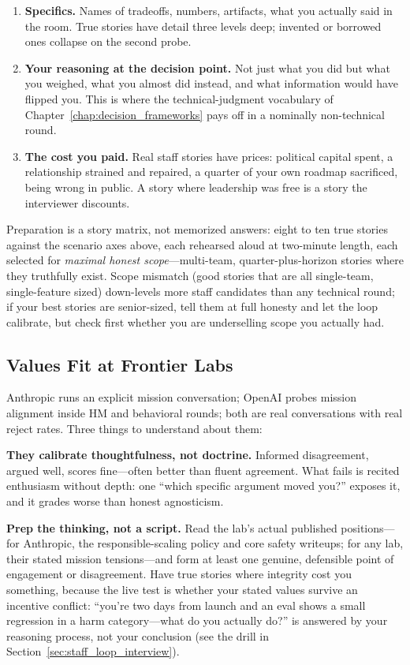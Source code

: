 \begin{enumerate}
    \item \textbf{Specifics.} Names of tradeoffs, numbers, artifacts, what you actually said in the room. True stories have detail three levels deep; invented or borrowed ones collapse on the second probe.
    \item \textbf{Your reasoning at the decision point.} Not just what you did but what you weighed, what you almost did instead, and what information would have flipped you. This is where the technical-judgment vocabulary of Chapter~\ref{chap:decision_frameworks} pays off in a nominally non-technical round.
    \item \textbf{The cost you paid.} Real staff stories have prices: political capital spent, a relationship strained and repaired, a quarter of your own roadmap sacrificed, being wrong in public. A story where leadership was free is a story the interviewer discounts.
\end{enumerate}

Preparation is a story matrix, not memorized answers: eight to ten true stories against the scenario axes above, each rehearsed aloud at two-minute length, each selected for \textit{maximal honest scope}---multi-team, quarter-plus-horizon stories where they truthfully exist. Scope mismatch (good stories that are all single-team, single-feature sized) down-levels more staff candidates than any technical round; if your best stories are senior-sized, tell them at full honesty and let the loop calibrate, but check first whether you are underselling scope you actually had.

\subsection{Values Fit at Frontier Labs}
\label{sec:values_fit}

Anthropic runs an explicit mission conversation; OpenAI probes mission alignment inside HM and behavioral rounds; both are real conversations with real reject rates. Three things to understand about them:

\textbf{They calibrate thoughtfulness, not doctrine.} Informed disagreement, argued well, scores fine---often better than fluent agreement. What fails is recited enthusiasm without depth: one ``which specific argument moved you?'' exposes it, and it grades worse than honest agnosticism.

\textbf{Prep the thinking, not a script.} Read the lab's actual published positions---for Anthropic, the responsible-scaling policy and core safety writeups; for any lab, their stated mission tensions---and form at least one genuine, defensible point of engagement or disagreement. Have true stories where integrity cost you something, because the live test is whether your stated values survive an incentive conflict: ``you're two days from launch and an eval shows a small regression in a harm category---what do you actually do?'' is answered by your reasoning process, not your conclusion (see the drill in Section~\ref{sec:staff_loop_interview}).

